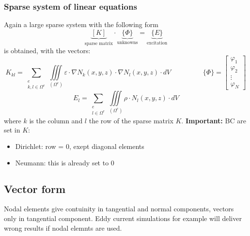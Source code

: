 \subsubsection{Sparse system of linear equations}
Again a large sparse system with the following form
\begin{equation*}	
	\underbrace{\left[K\right]}_{\textrm{sparse matrix}} \cdot \underbrace{\{\Phi\}}_{\textrm{unknowns}} = \underbrace{\{E\}}_{\textrm{excitation}}
\end{equation*}
is obtained, with the vectors:
\begin{equation*}
	K_{kl} = \sum_{\substack{e\\k,l\in\Omega^e}} \iiint\limits_{\left(\Omega ^e\right)} \varepsilon \cdot \nabla N_k(x,y,z) \cdot \nabla N_l(x,y,z) \cdot dV
	\hspace{2cm}
	\{\Phi\} =
	\begin{bmatrix}
		\varphi_1 \\
		\varphi_2 \\ 
		\vdots \\
		\varphi_N
	\end{bmatrix}
\end{equation*}
\begin{equation*}
	E_l = \sum_{\substack{e\\l\in\Omega^e}} \iiint\limits_{\left(\Omega ^e\right)} \rho \cdot N_l(x,y,z) \cdot dV
\end{equation*}
where $k$ is the column and $l$ the row of the sparse matrix $K$. \newline \newline
\textbf{Important:} BC are set in $K$:
\begin{itemize}
	\item Dirichlet: row = 0, exept diagonal elements
	\item Neumann: this is already set to 0
\end{itemize}

\subsection{Vector form}
Nodal elements give contuinity in tangential and normal components, vectors only in tangential component. Eddy current simulations for example will deliver wrong results if nodal elemnts are used. \newline \newline

